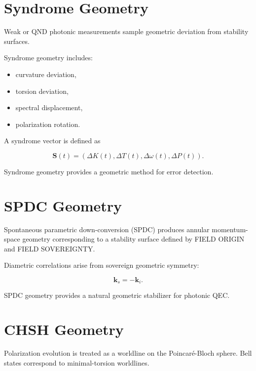 \documentclass[12pt,twoside]{article}
\begin{document}
\section{Syndrome Geometry}

Weak or QND photonic measurements sample geometric deviation from stability surfaces.

Syndrome geometry includes:

\begin{itemize}
    \item curvature deviation,
    \item torsion deviation,
    \item spectral displacement,
    \item polarization rotation.
\end{itemize}

A syndrome vector is defined as



\[
\mathbf{S}(t) = (\Delta K(t), \Delta T(t), \Delta \omega(t), \Delta P(t)).
\]



Syndrome geometry provides a geometric method for error detection.

\section{SPDC Geometry}

Spontaneous parametric down-conversion (SPDC) produces annular momentum-space
geometry corresponding to a stability surface defined by FIELD ORIGIN and FIELD
SOVEREIGNTY.

Diametric correlations arise from sovereign geometric symmetry:



\[
\mathbf{k}_{s} = -\mathbf{k}_{i}.
\]



SPDC geometry provides a natural geometric stabilizer for photonic QEC.

\section{CHSH Geometry}

Polarization evolution is treated as a worldline on the Poincaré-Bloch sphere. Bell states
correspond to minimal-torsion worldlines.
\end{document}
